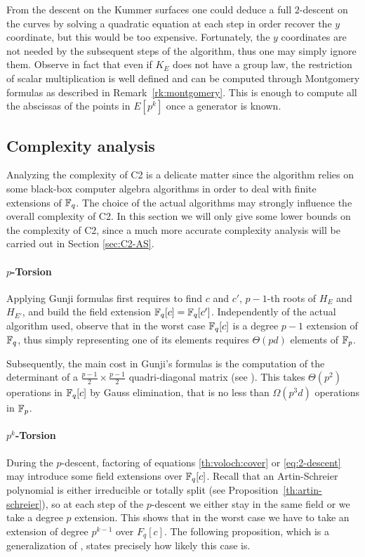 From the descent on the Kummer surfaces one could deduce a full
$2$-descent on the curves by solving a quadratic equation at each step
in order recover the $y$ coordinate, but this would be too
expensive. Fortunately, the $y$ coordinates are not needed by the
subsequent steps of the algorithm, thus one may simply ignore
them. Observe in fact that even if $K_E$ does not have a group law,
the restriction of scalar multiplication is well defined and can be
computed through Montgomery formulas as described in
Remark~\ref{rk:montgomery}. This is enough to compute all the
abscissas of the points in $E[p^k]$ once a generator is known.


\subsection{Complexity analysis}
\label{sec:C2:complexity}
Analyzing the complexity of C2 is a delicate matter since the
algorithm relies on some black-box computer algebra algorithms in
order to deal with finite extensions of $\mathbb{F}_q$. The choice of the
actual algorithms may strongly influence the overall complexity of C2.
In this section we will only give some lower bounds on the complexity
of C2, since a much more accurate complexity analysis will be carried
out in Section \ref{sec:C2-AS}.

\paragraph{$p$-Torsion}
Applying Gunji formulas first requires to find $c$ and $c'$, $p-1$-th
roots of $H_E$ and $H_{E'}$, and build the field extension $\mathbb{F}_q[c] =
\mathbb{F}_q[c']$. Independently of the actual algorithm used, observe that in
the worst case $\mathbb{F}_q[c]$ is a degree $p-1$ extension of $\mathbb{F}_q$, thus
simply representing one of its elements requires $\Theta(pd)$ elements
of $\mathbb{F}_p$.

Subsequently, the main cost in Gunji's formulas is the computation of
the determinant of a $\frac{p-1}{2}\times\frac{p-1}{2}$
quadri-diagonal matrix (see \cite{gunji76}). This takes $\Theta(p^2)$
operations in $\mathbb{F}_q[c]$ by Gauss elimination, that is no less than
$\Omega(p^3d)$ operations in $\mathbb{F}_p$.

\paragraph{$p^k$-Torsion}
During the $p$-descent, factoring of equations \eqref{th:voloch:cover}
or \eqref{eq:2-descent} may introduce some field extensions over
$\mathbb{F}_q[c]$. Recall that an Artin-Schreier polynomial is either
irreducible or totally split (see
Proposition~\ref{th:artin-schreier}), so at each step of the
$p$-descent we either stay in the same field or we take a degree $p$
extension. This shows that in the worst case we have to take an
extension of degree $p^{k-1}$ over $F_q[c]$. The following
proposition, which is a generalization of
\cite[Proposition~26]{lercier-algorithmique}, states precisely how
likely this case is.

